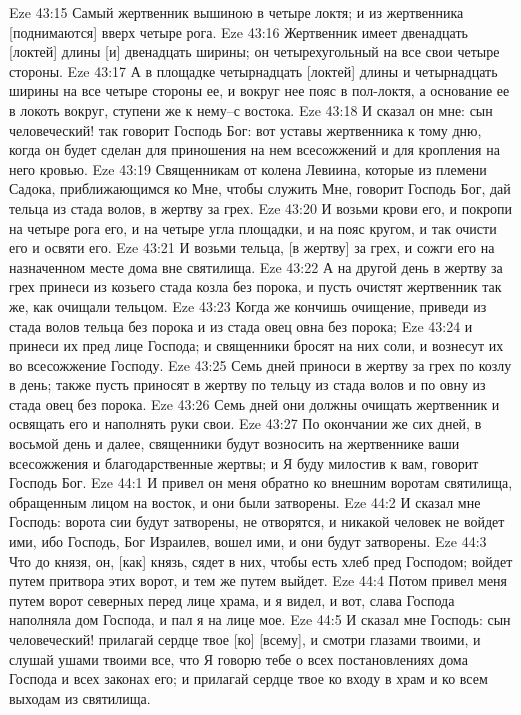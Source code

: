 Eze 43:15  Самый жертвенник вышиною в четыре локтя; и из жертвенника [поднимаются] вверх четыре рога.
Eze 43:16  Жертвенник имеет двенадцать [локтей] длины [и] двенадцать ширины; он четырехугольный на все свои четыре стороны.
Eze 43:17  А в площадке четырнадцать [локтей] длины и четырнадцать ширины на все четыре стороны ее, и вокруг нее пояс в пол-локтя, а основание ее в локоть вокруг, ступени же к нему--с востока.
Eze 43:18  И сказал он мне: сын человеческий! так говорит Господь Бог: вот уставы жертвенника к тому дню, когда он будет сделан для приношения на нем всесожжений и для кропления на него кровью.
Eze 43:19  Священникам от колена Левиина, которые из племени Садока, приближающимся ко Мне, чтобы служить Мне, говорит Господь Бог, дай тельца из стада волов, в жертву за грех.
Eze 43:20  И возьми крови его, и покропи на четыре рога его, и на четыре угла площадки, и на пояс кругом, и так очисти его и освяти его.
Eze 43:21  И возьми тельца, [в жертву] за грех, и сожги его на назначенном месте дома вне святилища.
Eze 43:22  А на другой день в жертву за грех принеси из козьего стада козла без порока, и пусть очистят жертвенник так же, как очищали тельцом.
Eze 43:23  Когда же кончишь очищение, приведи из стада волов тельца без порока и из стада овец овна без порока;
Eze 43:24  и принеси их пред лице Господа; и священники бросят на них соли, и вознесут их во всесожжение Господу.
Eze 43:25  Семь дней приноси в жертву за грех по козлу в день; также пусть приносят в жертву по тельцу из стада волов и по овну из стада овец без порока.
Eze 43:26  Семь дней они должны очищать жертвенник и освящать его и наполнять руки свои.
Eze 43:27  По окончании же сих дней, в восьмой день и далее, священники будут возносить на жертвеннике ваши всесожжения и благодарственные жертвы; и Я буду милостив к вам, говорит Господь Бог.
Eze 44:1  И привел он меня обратно ко внешним воротам святилища, обращенным лицом на восток, и они были затворены.
Eze 44:2  И сказал мне Господь: ворота сии будут затворены, не отворятся, и никакой человек не войдет ими, ибо Господь, Бог Израилев, вошел ими, и они будут затворены.
Eze 44:3  Что до князя, он, [как] князь, сядет в них, чтобы есть хлеб пред Господом; войдет путем притвора этих ворот, и тем же путем выйдет.
Eze 44:4  Потом привел меня путем ворот северных перед лице храма, и я видел, и вот, слава Господа наполняла дом Господа, и пал я на лице мое.
Eze 44:5  И сказал мне Господь: сын человеческий! прилагай сердце твое [ко] [всему], и смотри глазами твоими, и слушай ушами твоими все, что Я говорю тебе о всех постановлениях дома Господа и всех законах его; и прилагай сердце твое ко входу в храм и ко всем выходам из святилища.
